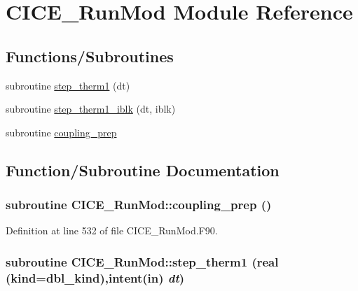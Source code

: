 \hypertarget{namespaceCICE__RunMod}{
\section{CICE\_\-RunMod Module Reference}
\label{namespaceCICE__RunMod}
}
\subsection*{Functions/Subroutines}
\begin{DoxyCompactItemize}
\item 
subroutine \hyperlink{namespaceCICE__RunMod_a82d80aca1f05476da48020976c7c6167}{step\_\-therm1} (dt)
\item 
subroutine \hyperlink{namespaceCICE__RunMod_a111ec6740d3c04411c4a93a7d7c129bf}{step\_\-therm1\_\-iblk} (dt, iblk)
\item 
subroutine \hyperlink{namespaceCICE__RunMod_abf11b85df210128b2304fac42127a723}{coupling\_\-prep}
\end{DoxyCompactItemize}


\subsection{Function/Subroutine Documentation}
\hypertarget{namespaceCICE__RunMod_abf11b85df210128b2304fac42127a723}{
\subsubsection[{coupling\_\-prep}]{\setlength{\rightskip}{0pt plus 5cm}subroutine CICE\_\-RunMod::coupling\_\-prep ()}}
\label{namespaceCICE__RunMod_abf11b85df210128b2304fac42127a723}


Definition at line 532 of file CICE\_\-RunMod.F90.\hypertarget{namespaceCICE__RunMod_a82d80aca1f05476da48020976c7c6167}{
\subsubsection[{step\_\-therm1}]{\setlength{\rightskip}{0pt plus 5cm}subroutine CICE\_\-RunMod::step\_\-therm1 (real (kind=dbl\_\-kind),intent(in) {\em dt})}}
\label{namespaceCICE__RunMod_a82d80aca1f05476da48020976c7c6167}



